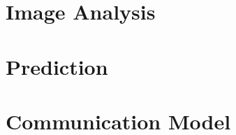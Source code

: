 \section{Image Analysis}
\label{sec:analysis_img}


\section{Prediction}
\label{sec:analysis_pred}


\section{Communication Model}
\label{sec:analysis_communication}
